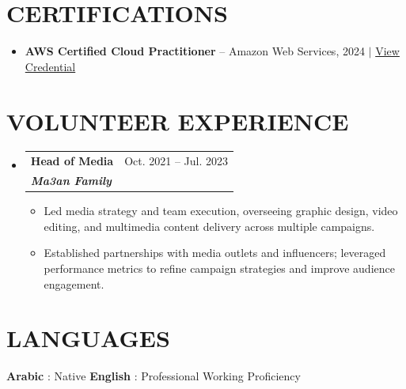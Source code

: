 \documentclass[letterpaper,11pt]{article}
\makeatletter
\newcommand{\resumeItem}[1]{
  \item\small{
    {#1 \vspace{-1pt}}
  }
}
\newcommand{\resumeSubheading}[4]{
  \vspace{-1pt}\item
    \begin{tabular*}{\textwidth}[t]{l@{\extracolsep{\fill}}r}
      \textbf{#1} & {\color{dark-grey}\small #2}\vspace{1pt}\\
      \textit{#3} & {\color{dark-grey} \small #4}\\
    \end{tabular*}\vspace{-4pt}
}
\newcommand{\resumeSubHeadingListStart}{\begin{itemize}[leftmargin=0in, label={}]}
\newcommand{\resumeSubHeadingListEnd}{\end{itemize}}
\newcommand{\resumeItemListStart}{\begin{itemize}}
\newcommand{\resumeItemListEnd}{\end{itemize}\vspace{0pt}}
\makeatother
\begin{document}
\section{CERTIFICATIONS}
\begin{itemize}[leftmargin=0.15in]
  \resumeItem{\textbf{AWS Certified Cloud Practitioner} -- Amazon Web Services, 2024 \textnormal{\small $|$ \href{https://www.linkedin.com/posts/ahm215_aws-certified-cloud-practitioner-was-issued-activity-7274436150700769281-TAJd}{View Credential}}}
\end{itemize}

\section{VOLUNTEER EXPERIENCE}
  \resumeSubHeadingListStart
    \resumeSubheading
      {\textbf{Head of Media}}{Oct. 2021 -- Jul. 2023}
      {\textbf{Ma3an Family}}{}
      \resumeItemListStart
        \resumeItem{Led media strategy and team execution, overseeing graphic design, video editing, and multimedia content delivery across multiple campaigns.}
        \resumeItem{Established partnerships with media outlets and influencers; leveraged performance metrics to refine campaign strategies and improve audience engagement.}
      \resumeItemListEnd
  \resumeSubHeadingListEnd

\section{LANGUAGES}
 \begin{itemize}[leftmargin=0in, label={}]
    \small{\item{
     \textbf{Arabic} {: Native} \hspace{24pt}
     \textbf{English} {: Professional Working Proficiency}
    }}
 \end{itemize}

\end{document}
